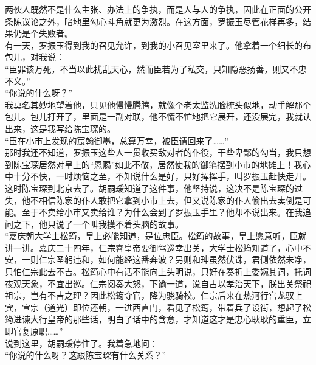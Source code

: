 两伙人既然不是什么主张、办法上的争执，而是人与人的争执，因此在正面的公开条陈议论之外，暗地里勾心斗角就更为激烈。在这方面，罗振玉尽管花样再多，结果仍是个失败者。\\

有一天，罗振玉得到我的召见允许，到我的小召见室里来了。他拿着一个细长的布包儿，对我说：\\

“臣罪该万死，不当以此扰乱天心，然而臣若为了私交，只知隐恶扬善，则又不忠不义。”\\

“你说的什么呀？”\\

我莫名其妙地望着他，只见他慢慢腾腾，就像个老太监洗脸梳头似地，动手解那个包儿。包儿打开了，里面是一副对联，他不慌不忙地把它展开，还没展完，我就认出来，这是我写给陈宝琛的。\\

“臣在小市上发现的宸翰御墨，总算万幸，被臣请回来了……”\\

那时我还不知道，罗振玉这些人一贯收买敌对者的仆役，干些卑鄙的勾当，我只想到陈宝琛居然对皇上的“恩赐”如此不敬，居然使我的御笔摆到小市的地摊上！我心中十分不快，一时烦恼之至，不知说什么是好，只好挥挥手，叫罗振玉赶快走开。\\

这时陈宝琛到北京去了。胡嗣瑗知道了这件事，他坚持说，这决不是陈宝琛的过失，他不相信陈家的仆人敢把它拿到小市上去，但又说陈家的仆人偷出去卖倒是可能。至于不卖给小市又卖给谁？为什么会到了罗振玉手里？他却不说出来。在我追问之下，他只说了一个叫我摸不着头脑的故事。\\

“嘉庆朝大学士松筠，皇上必能知道，是位忠臣。松筠的故事，皇上愿意听，臣就讲一讲。嘉庆二十四年，仁宗睿皇帝要御驾巡幸出关，大学士松筠知道了，心中不安，一则仁宗圣躬违和，如何能经这番奔波？另则和珅虽然伏诛，君侧依然未净，只怕仁宗此去不吉。松筠心中有话不能向上头明说，只好在奏折上委婉其词，托词夜观天象，不宜出巡。仁宗阅奏大怒，下谕一道，说自古以孝治天下，朕出关祭祀祖宗，岂有不吉之理？因此松筠夺官，降为骁骑校。仁宗后来在热河行宫龙驭上宾，宣宗（道光）即位还朝，一进西直门，看见了松筠，带着兵了设街，想起了松筠进谏大行皇帝的那些话，明白了话中的含意，才知道这才是忠心耿耿的重臣，立即官复原职……”\\

说到这里，胡嗣瑗停住了。我着急地问：\\

“你说的什么呀？这跟陈宝琛有什么关系？”\\

